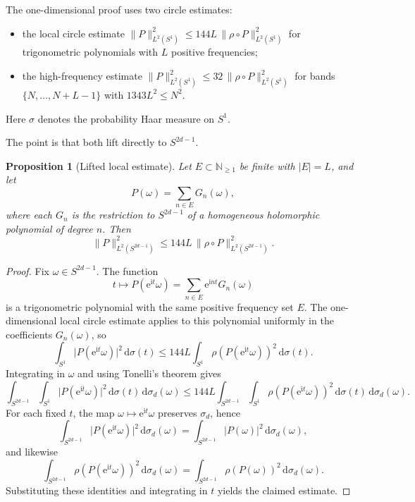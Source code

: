 \documentclass[11pt]{amsart}
\newtheorem{proposition}[theorem]{Proposition}
\theoremstyle{remark}
\newcommand{\N}{\mathbb{N}}
\newcommand{\abs}[1]{\lvert #1 \rvert}
\newcommand{\norm}[1]{\lVert #1 \rVert}
\newcommand{\dd}{\mathrm{d}}
\newcommand{\ee}{\mathrm{e}}
\newcommand{\ii}{\mathrm{i}}
\newcommand{\rhoFn}{\rho}
\newcommand{\Sphere}{S^{2d-1}}
\begin{document}
The one-dimensional proof uses two circle estimates:

\begin{itemize}
\item the local circle estimate
$\norm{P}_{L^2(S^1)}^2 \le 144 L\, \norm{\rhoFn \circ P}_{L^2(S^1)}^2$
for trigonometric polynomials with $L$ positive frequencies;
\item the high-frequency estimate
$\norm{P}_{L^2(S^1)}^2 \le 32\, \norm{\rhoFn \circ P}_{L^2(S^1)}^2$
for bands $\{N,\dots,N+L-1\}$ with $1343L^2 \le N^2$.
\end{itemize}

Here $\sigma$ denotes the probability Haar measure on $S^1$.

The point is that both lift directly to $\Sphere$.

\begin{proposition}[Lifted local estimate]\label{prop:lifted-local}
Let $E \subset \N_{\ge 1}$ be finite with $\abs{E} = L$, and let
\[
P(\omega) = \sum_{n \in E} G_n(\omega),
\]
where each $G_n$ is the restriction to $\Sphere$ of a homogeneous
holomorphic polynomial of degree $n$.  Then
\[
\norm{P}_{L^2(\Sphere)}^2
\le
144 L\, \norm{\rhoFn \circ P}_{L^2(\Sphere)}^2.
\]
\end{proposition}

\begin{proof}
Fix $\omega \in \Sphere$.  The function
\[
t \mapsto P(\ee^{\ii t}\omega)
=
\sum_{n \in E} \ee^{\ii nt} G_n(\omega)
\]
is a trigonometric polynomial with the same positive frequency set $E$.
The one-dimensional local circle estimate applies to this polynomial
uniformly in the coefficients $G_n(\omega)$, so
\[
\int_{S^1} \abs{P(\ee^{\ii t}\omega)}^2\,\dd \sigma(t)
\le
144 L
\int_{S^1} \rhoFn(P(\ee^{\ii t}\omega))^2\,\dd \sigma(t).
\]
Integrating in $\omega$ and using Tonelli's theorem gives
\[
\int_{\Sphere}\!\int_{S^1} \abs{P(\ee^{\ii t}\omega)}^2
\,\dd \sigma(t)\,\dd \sigma_d(\omega)
\le
144L
\int_{\Sphere}\!\int_{S^1} \rhoFn(P(\ee^{\ii t}\omega))^2
\,\dd \sigma(t)\,\dd \sigma_d(\omega).
\]
For each fixed $t$, the map $\omega \mapsto \ee^{\ii t}\omega$ preserves
$\sigma_d$, hence
\[
\int_{\Sphere} \abs{P(\ee^{\ii t}\omega)}^2\,\dd \sigma_d(\omega)
=
\int_{\Sphere} \abs{P(\omega)}^2\,\dd \sigma_d(\omega),
\]
and likewise
\[
\int_{\Sphere} \rhoFn(P(\ee^{\ii t}\omega))^2\,\dd \sigma_d(\omega)
=
\int_{\Sphere} \rhoFn(P(\omega))^2\,\dd \sigma_d(\omega).
\]
Substituting these identities and integrating in $t$ yields the claimed
estimate.
\end{proof}
\end{document}
